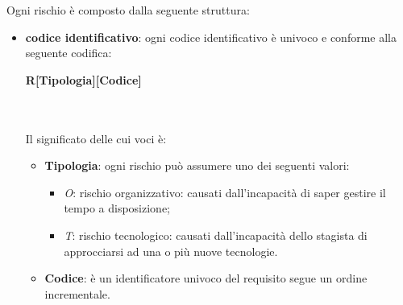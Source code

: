 Ogni rischio è composto dalla seguente struttura:
\begin{itemize}
	\item \textbf{codice identificativo}: ogni codice identificativo è univoco e conforme alla seguente codifica:\\
	\centerline{\textbf{R[Tipologia][Codice]}} \\ \\
	Il significato delle cui voci è:
	\begin{itemize}
		\item \textbf{Tipologia}: ogni rischio può assumere uno dei seguenti valori:
		\begin{itemize}
			\item \textit{O}: rischio organizzativo: causati dall'incapacità di saper gestire il tempo a disposizione;
			\item \textit{T}: rischio tecnologico: causati dall'incapacità dello stagista di approcciarsi ad una o più nuove tecnologie.
		\end{itemize}
		\item \textbf{Codice}: è un identificatore univoco del requisito segue un ordine incrementale.
	\end{itemize}
\end{itemize}

